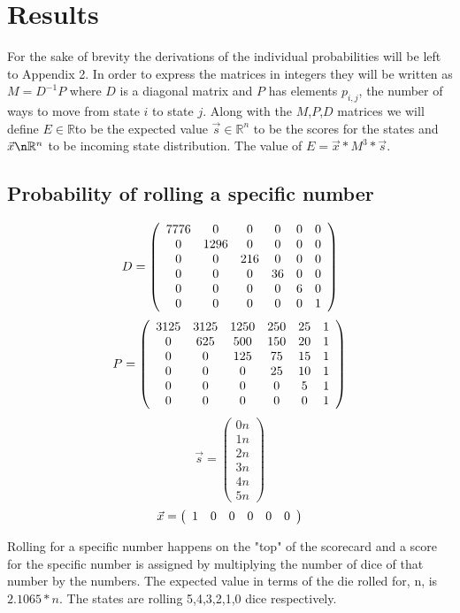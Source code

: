 \section{Results}

For the sake of brevity the derivations of the individual probabilities will be left to Appendix 2. In order to express the matrices in integers they will be written as $M=D^{-1}P$ where $D$ is a diagonal matrix and $P$ has elements $p_{i,j}$, the number of ways to move from state $i$ to state $j$. Along with the $M$,$P$,$D$ matrices we will define $E \in \mathbb{R}$to be the expected value $\vec{s} \in \mathbb{R}^n$ to be the scores for the states and $\vec{x} \n \mathbb{R}^n$ to be incoming state distribution. The value of $E=\vec{x}*M^3*\vec{s}$.



\subsection{Probability of rolling a specific number}
\[
D=
\left(
\begin{array}{c c c c c c}
7776 &0&0&0&0&0\\
0 & 1296&0&0&0&0\\
0 &0&216&0&0&0\\
0 &0&0&36&0&0\\
0 &0&0&0&6&0\\
0&0&0&0&0&1
\end{array}
\right)
\]
\[
P=
\left(
\begin{array}{c c c c c c}
3125 & 3125 & 1250 & 250 & 25 & 1\\
0 & 625 & 500 & 150 & 20 & 1\\
0 & 0 & 125 & 75 & 15 & 1\\
0 & 0 & 0 & 25 & 10 & 1\\
0 & 0 & 0 & 0 & 5 & 1\\
0 & 0 & 0 & 0 & 0 & 1
\end{array}
\right)
\]
\[
\vec{s}=
\left(
\begin{array}{c}
0n\\
1n\\
2n\\
3n\\
4n\\
5n
\end{array}
\right)
\]
\[
\vec{x}=
\left(
\begin{array}{c c c c c c}
1&0&0&0&0&0
\end{array}
\right)
\]

Rolling for a specific number happens on the "top" of the scorecard and a score for the specific number is assigned by multiplying the number of dice of that number by the numbers. The expected value in terms of the die rolled for, n, is $2.1065*n$. The states are rolling 5,4,3,2,1,0 dice respectively. 

